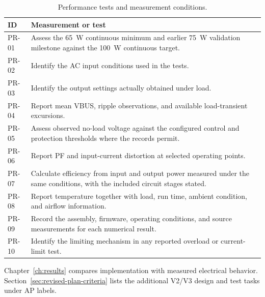 \begin{table}[H]
\centering
\caption{Performance tests and measurement conditions.}
\label{tab:req-performance}
\begin{tabularx}{\textwidth}{@{}L{0.12\textwidth}Y@{}}
\toprule
ID & Measurement or test\\
\midrule
PR-01 & Assess the \SI{65}{\watt} continuous minimum and earlier \SI{75}{\watt} validation milestone against the \SI{100}{\watt} continuous target.\\
PR-02 & Identify the AC input conditions used in the tests.\\
PR-03 & Identify the output settings actually obtained under load.\\
PR-04 & Report mean VBUS, ripple observations, and available load-transient excursions.\\
PR-05 & Assess observed no-load voltage against the configured control and protection thresholds where the records permit.\\
PR-06 & Report PF and input-current distortion at selected operating points.\\
PR-07 & Calculate efficiency from input and output power measured under the same conditions, with the included circuit stages stated.\\
PR-08 & Report temperature together with load, run time, ambient condition, and airflow information.\\
PR-09 & Record the assembly, firmware, operating conditions, and source measurements for each numerical result.\\
PR-10 & Identify the limiting mechanism in any reported overload or current-limit test.\\
\bottomrule
\end{tabularx}
\end{table}

Chapter~\ref{ch:results} compares implementation with measured electrical behavior. Section~\ref{sec:revised-plan-criteria} lists the additional V2/V3 design and test tasks under AP labels.
